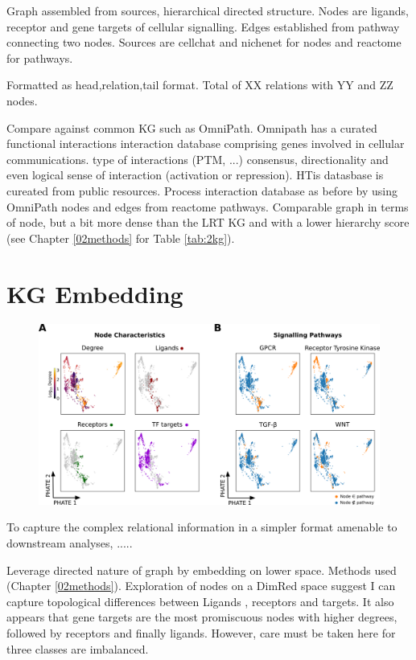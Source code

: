 Graph assembled from sources, hierarchical directed structure. Nodes are ligands, receptor and gene targets of cellular signalling. Edges established from pathway connecting two nodes. Sources are cellchat and nichenet for nodes and reactome for pathways.

Formatted as head,relation,tail format. Total of XX relations with YY and ZZ nodes.

Compare against common KG such as OmniPath.
Omnipath has a curated functional interactions interaction database comprising genes involved in cellular communications. type of interactions (PTM, ...) consensus, directionality and even logical sense of interaction (activation or repression). HTis datasbase is cureated from public resources.
Process interaction database as before by using OmniPath nodes and edges from reactome pathways. 
Comparable graph in terms of node, but a bit more dense than the LRT KG and with a lower hierarchy score (see Chapter \ref{02methods} for Table \ref{tab:2kg}).



\section{KG Embedding}

\begin{figure}
    \centering
    \includegraphics{06kg/figs/6KG_embed.png}
    \caption{}
    \label{fig:6embed}
\end{figure}

To capture the complex relational information in a simpler format amenable to downstream analyses, .....

Leverage directed nature of graph by embedding on lower space. Methods used (Chapter \ref{02methods}). Exploration of nodes on a DimRed space suggest I can capture topological differences between Ligands , receptors and targets. It also appears that gene targets are the most promiscuous nodes with higher degrees, followed by receptors and finally ligands. However, care must be taken here for three classes are imbalanced.

